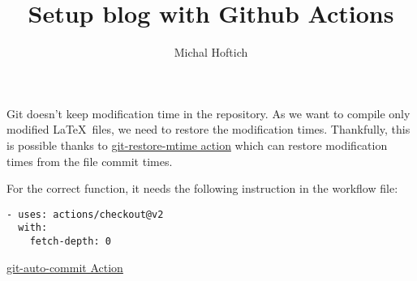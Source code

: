 \documentclass{article}
\title{Setup blog with Github Actions}
\author{Michal Hoftich}
\begin{document}
\maketitle

Git doesn't keep modification time in the repository. As we want to compile only modified
\LaTeX\ files, we need to restore the modification times. 
Thankfully, this is possible thanks to 
\href{https://github.com/chetan/git-restore-mtime-action}{git-restore-mtime action}
which can restore modification times from the file commit times.

For the correct function, it needs the following instruction in the workflow file:

\begin{verbatim}
- uses: actions/checkout@v2
  with:
    fetch-depth: 0
\end{verbatim}

\href{https://github.com/stefanzweifel/git-auto-commit-action}{git-auto-commit Action}
\end{document}
